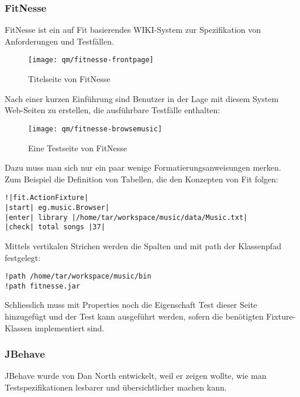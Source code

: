\subsubsection{FitNesse}
FitNesse ist ein auf Fit basierendes WIKI-System zur Spezifikation von
Anforderungen und Testfällen.
\begin{figure}[H]
\begin{center}
\texttt{[image: qm/fitnesse-frontpage]}
\caption{Titelseite von FitNesse}
\end{center}
\end{figure}
\newslide
Nach einer kurzen Einführung sind Benutzer in der Lage mit diesem System
Web-Seiten zu erstellen,
die ausführbare Testfälle enthalten:
\begin{figure}[H]
\begin{center}
\texttt{[image: qm/fitnesse-browsemusic]}
\caption{Eine Testseite von FitNesse}
\end{center}
\end{figure}
\newslide
Dazu muss man sich nur ein paar
 wenige Formatierungsanweisungen merken. Zum Beispiel die Definition von
 Tabellen, die den Konzepten von Fit folgen:
\begin{verbatim}
!|fit.ActionFixture|
|start| eg.music.Browser|
|enter| library |/home/tar/workspace/music/data/Music.txt|
|check| total songs |37|
\end{verbatim}
Mittels vertikalen Strichen werden die Spalten und mit path der Klassenpfad
festgelegt:
\begin{verbatim}
!path /home/tar/workspace/music/bin
!path fitnesse.jar
\end{verbatim}
Schliesslich muss mit Properties noch die Eigenschaft Test dieser Seite
hinzugefügt und der Test kann ausgeführt werden, sofern die benötigten
Fixture-Klassen implementiert sind.
%
\newslide
\subsubsection{JBehave}
JBehave wurde von Dan North entwickelt, weil er zeigen wollte, wie man
Testspezifikationen lesbarer und übersichtlicher machen kann.

